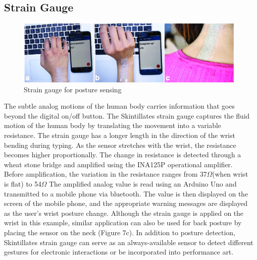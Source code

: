 \documentclass{sigchi}
\begin{document}
\subsection {Strain Gauge}
\begin{figure}
\centering
\includegraphics[width=1.0\textwidth]{figures/Figure9}
\caption{Strain gauge for posture sensing}
\vspace{-8pt}
\label{fig:figure9}
\end{figure}
The subtle analog motions of the human body carries information that goes beyond the digital on/off button. The Skintillates strain gauge captures the fluid motion of the human body by translating the movement into a variable resistance. %
 The strain gauge has a longer length in the direction of the wrist bending during typing. As the sensor stretches with the wrist, the resistance becomes higher proportionally. The change in resistance is detected through a wheat stone bridge and amplified using the INA125P operational amplifier. Before amplification, the variation in the resistance ranges from 37$\Omega$(when wrist is flat) to 54$\Omega$ The amplified analog value is read using an Arduino Uno and transmitted to a mobile phone via bluetooth. 
 The value is then displayed on the screen of the mobile phone, and the appropriate warning messages are displayed as the user’s wrist posture change. Although the strain gauge is applied on the wrist in this example, similar application can also be used for back posture by placing the sensor on the neck (Figure 7c). In addition to posture detection, Skintillates strain gauge can serve as an always-available sensor to detect different gestures for electronic interactions or be incorporated into performance art. 
\end{document}
